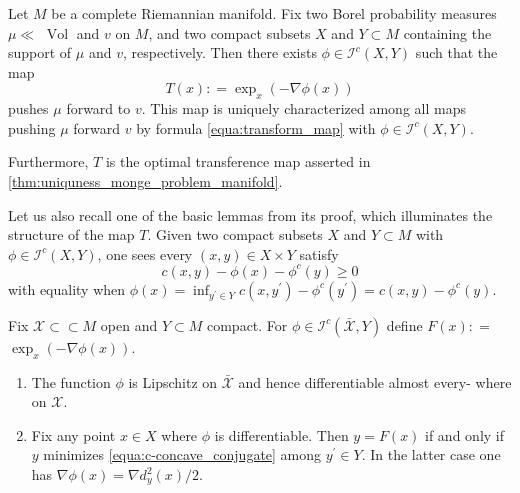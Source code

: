 \begin{thm}
	\label{thm:optimal_transport_manifold}
	Let \( M \) be a complete Riemannian manifold.
	Fix two Borel probability measures \( \mu \ll \) $\operatorname{Vol}$ and \( v \) on \( M \),
	and two compact subsets \( X \) and \( Y \subset M \) containing the support of \( \mu \) and \( v \),
	respectively.
	Then there exists \( \phi \in \mathcal { I } ^ { c } ( X , Y ) \) such that the map
	\begin{equation}
		\label{equa:transform_map}
		T ( x ) : = \exp _ { x } ( - \nabla \phi ( x ) )
	\end{equation}
	pushes \( \mu \) forward to \( v \).
	This map is uniquely characterized among all maps pushing \( \mu \) forward \( v \) by formula \cref{equa:transform_map} with \( \phi \in \mathcal{I} ^ { c } ( X , Y )\).

	Furthermore, $T$ is the optimal transference map asserted in \cref{thm:uniquness_monge_problem_manifold}.
\end{thm}

Let us also recall one of the basic lemmas from its proof,
which illuminates the structure of the map \( T \).
Given two compact subsets \( X \) and \( Y \subset M \) with \( \phi \in \mathcal { I } ^ { c } ( X , Y ) \),
one sees every \( ( x , y ) \in X \times Y \) satisfy
\begin{equation}
	\label{equa:c-concave_conjugate}
	c ( x , y ) - \phi ( x ) - \phi ^ { c } ( y ) \geq 0
\end{equation}
with equality when \( \phi ( x ) = \inf _ { y ^ { \prime } \in Y } c \left( x , y ^ { \prime } \right) - \phi ^ { c } \left( y ^ { \prime } \right) = c ( x , y ) - \phi ^ { c } ( y ) . \)

\begin{lem}
	\label{lem:minimizer_differentiable}
	Fix \( \mathcal{X} \subset \subset M \) open and \( Y \subset M \) compact.
	For \( \phi \in \mathcal{I} ^ { c } ( \bar { \mathcal{X} } , Y ) \) define \( F ( x ) : = \)
	\( \exp _ { x } ( - \nabla \phi ( x ) ) \).
	\begin{enumerate}
		\item The function \( \phi \) is Lipschitz on \( \bar { \mathcal{X} } \) and hence differentiable almost every-
		      where on \( \mathcal{X} \).
		\item Fix any point \( x \in X \) where \( \phi \) is differentiable. Then \( y = F ( x ) \) if and
		      only if \( y \) minimizes \cref{equa:c-concave_conjugate} among \( y ^ { \prime } \in Y . \) In the latter case one has
		      \( \nabla \phi ( x ) = \nabla d _ { y } ^ { 2 } ( x ) / 2 \).
	\end{enumerate}
\end{lem}

